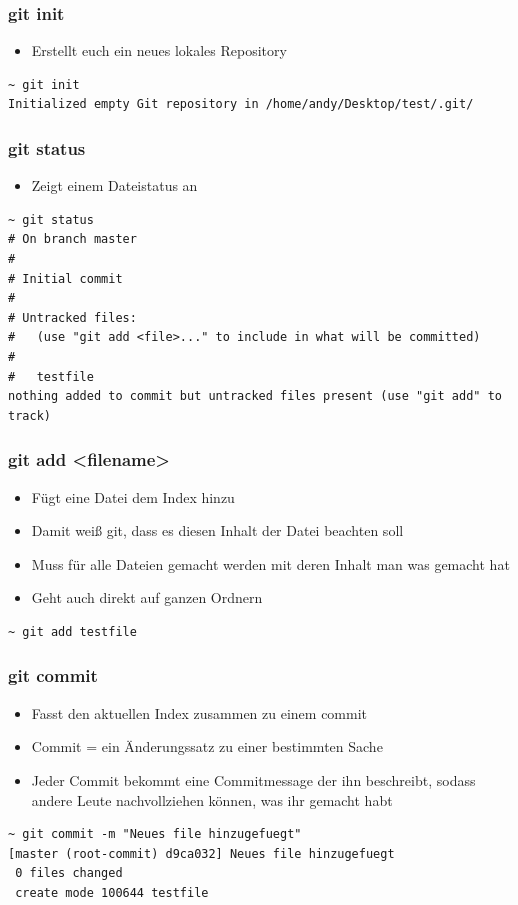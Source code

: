 \documentclass[ngerman,compress]{beamer}
\begin{document}
\begin{frame} [fragile]
	\frametitle{git init}
	\begin{itemize}
		\item Erstellt euch ein neues lokales Repository
	\end{itemize}
	\begin{lstlisting}
~ git init
Initialized empty Git repository in /home/andy/Desktop/test/.git/
	\end{lstlisting}
\end{frame}

\begin{frame} [fragile]
	\frametitle{git status}
	\begin{itemize}
		\item Zeigt einem Dateistatus an
	\end{itemize}
	\begin{lstlisting}
~ git status
# On branch master
#
# Initial commit
#
# Untracked files:
#   (use "git add <file>..." to include in what will be committed)
#
#	testfile
nothing added to commit but untracked files present (use "git add" to track)
	\end{lstlisting}

\end{frame}

\begin{frame} [fragile]
	\frametitle{git add <filename>}
	\begin{itemize}
		\item Fügt eine Datei dem Index hinzu
		\item Damit weiß git, dass es diesen Inhalt der Datei beachten soll
		\item Muss für alle Dateien gemacht werden mit deren Inhalt man was gemacht hat
		\item Geht auch direkt auf ganzen Ordnern
	\end{itemize}
	\begin{lstlisting}
~ git add testfile
	\end{lstlisting}
\end{frame}

\begin{frame} [fragile]
	\frametitle{git commit}
	\begin{itemize}
		\item Fasst den aktuellen Index zusammen zu einem commit
		\item Commit = ein Änderungssatz zu einer bestimmten Sache
		\item Jeder Commit bekommt eine Commitmessage der ihn beschreibt, sodass andere Leute nachvollziehen können, was ihr gemacht habt
	\end{itemize}
	\begin{lstlisting}
~ git commit -m "Neues file hinzugefuegt"
[master (root-commit) d9ca032] Neues file hinzugefuegt
 0 files changed
 create mode 100644 testfile
	\end{lstlisting}
\end{frame}
\end{document}
